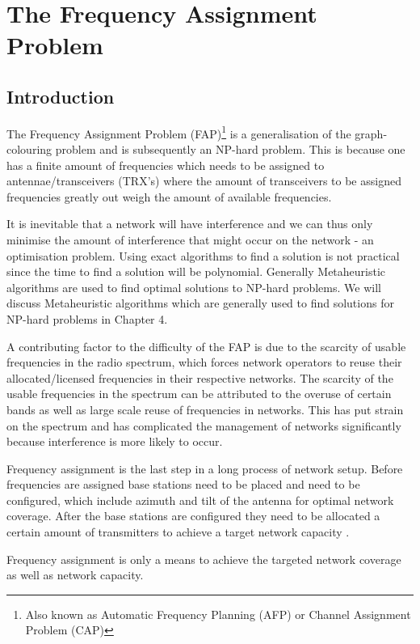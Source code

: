 \chapter{The Frequency Assignment Problem}
\label{chpt:fap}
\section{Introduction}
The Frequency Assignment Problem (FAP)\footnote{Also known as Automatic Frequency Planning (AFP) or Channel Assignment Problem (CAP)\cite{ACOvsEA}} is a generalisation of the graph-colouring problem and is subsequently an NP-hard problem. This is because one has a finite amount of frequencies which needs to be assigned to antennae/transceivers (TRX's)  where the amount of transceivers to be assigned frequencies greatly out weigh the amount of available frequencies.

It is inevitable that a network will have interference and we can thus only minimise the amount of interference that might occur on the network - an optimisation problem. Using exact algorithms to find a solution is not practical since the time to find a solution will be polynomial. Generally Metaheuristic algorithms are used to find optimal solutions to NP-hard problems\cite{ACOvsEA}. We will discuss Metaheuristic algorithms which are generally used to find solutions for NP-hard problems in Chapter 4. 

A contributing factor to the difficulty of the FAP is due to the scarcity of usable frequencies in the radio spectrum, which forces network operators to reuse their allocated/licensed frequencies in their respective networks. The scarcity of the usable frequencies in the spectrum can be attributed to the overuse of certain bands as well as large scale reuse of frequencies in networks. This has put strain on the spectrum and has complicated the management of networks significantly because interference is more likely to occur.

Frequency assignment is the last step in a long process of network setup. Before frequencies are assigned base stations need to be placed and need to be configured, which include azimuth and tilt of the antenna for optimal network coverage. After the base stations are configured they need to be allocated a certain amount of transmitters to achieve a target network capacity \cite{AndreasPaper}.

Frequency assignment is only a means to achieve the targeted network coverage as well as network capacity.

